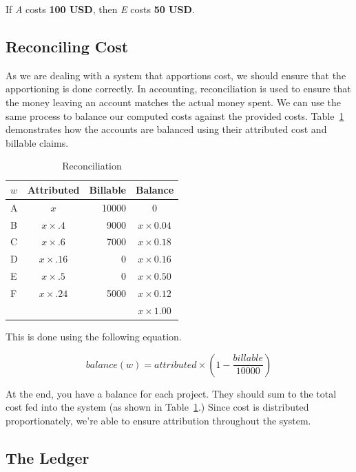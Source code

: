 \documentclass[10pt, a4paper, twocolumn]{article}
\begin{document}
      If \textit{A} costs \textbf{100 USD}, then \textit{E} costs \textbf{50 USD}.

  \subsection*{Reconciling Cost}
    As we are dealing with a system that apportions cost, we should ensure that the apportioning is done correctly.
    In accounting, reconciliation is used to ensure that the money leaving an account matches the actual money spent.
    We can use the same process to balance our computed costs against the provided costs.
    Table~\ref{table:1} demonstrates how the accounts are balanced using their attributed cost and billable claims.

    \begin{table}[H]
      \centering
      \begin{tabular}{ l|c|r|c }
        $w$ & Attributed       & Billable & Balance \\
        \hline
        A   & $ x            $ &    10000 & $ 0 $ \\
        B   & $ x \times .4  $ &     9000 & $ x \times 0.04 $ \\
        C   & $ x \times .6  $ &     7000 & $ x \times 0.18 $ \\
        D   & $ x \times .16 $ &        0 & $ x \times 0.16 $ \\
        E   & $ x \times .5  $ &        0 & $ x \times 0.50 $ \\
        F   & $ x \times .24 $ &     5000 & $ x \times 0.12 $ \\
        \hline
            &                  &          & $ x \times 1.00 $ \\
      \end{tabular}
      \caption{Reconciliation}
      \label{table:1}
    \end{table}

    This is done using the following equation.

    \[ balance(w) = attributed \times \left(1 - \frac{billable}{10000}\right) \]

    At the end, you have a balance for each project.
    They should sum to the total cost fed into the system (as shown in Table~\ref{table:1}.)
    Since cost is distributed proportionately, we're able to ensure attribution throughout the system.

  \subsection*{The Ledger}
\end{document}
